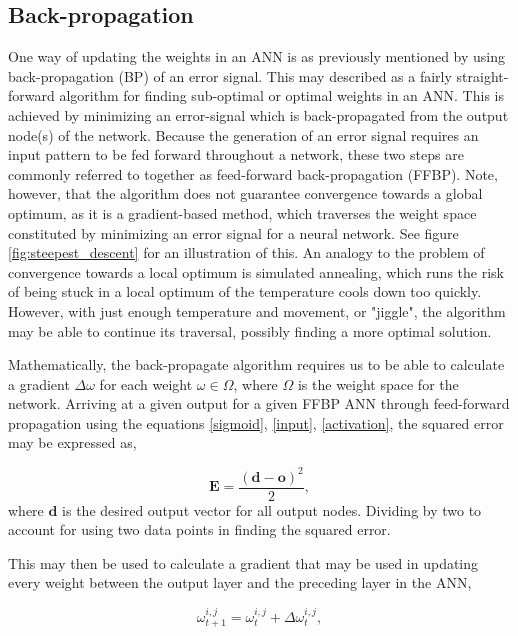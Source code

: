 \subsection{Back-propagation}\label{BP}

One way of updating the weights in an ANN is as previously mentioned by using back-propagation (BP) of an error signal. This may described as a fairly straight-forward algorithm for finding sub-optimal or optimal weights in an ANN. This is achieved by minimizing an error-signal which is back-propagated from the output node(s) of the network. Because the generation of an error signal requires an input pattern to be fed forward throughout a network, these two steps are commonly referred to together as feed-forward back-propagation (FFBP). Note, however, that the algorithm does not guarantee convergence towards a global optimum, as it is a gradient-based method, which traverses the weight space constituted by minimizing an error signal for a neural network. See figure \ref{fig:steepest_descent} for an illustration of this. An analogy to the problem of convergence towards a local optimum is simulated annealing, which runs the risk of being stuck in a local optimum of the temperature cools down too quickly. However, with just enough temperature and movement, or "jiggle", the algorithm may be able to continue its traversal, possibly finding a more optimal solution.

Mathematically, the back-propagate algorithm requires us to be able to calculate a gradient $\Delta \omega$ for each weight $\omega \in \Omega$, where $\Omega$ is the weight space for the network. Arriving at a given output for a given FFBP ANN through feed-forward propagation using the equations \eqref{sigmoid}, \eqref{input}, \eqref{activation}, the squared error may be expressed as,

\begin{equation}
    \textbf{E} = \frac{(\textbf{d} - \textbf{o})^2}{2},
\end{equation}
where $\textbf{d}$ is the desired output vector for all output nodes. Dividing by two to account for using two data points in finding the squared error.

This may then be used to calculate a gradient that may be used in updating every weight between the output layer and the preceding layer in the ANN,

\begin{equation}\label{weight_update}
    \omega_{t+1}^{i,j} = \omega_{t}^{i,j} + \Delta \omega_{t}^{i,j},
\end{equation}

